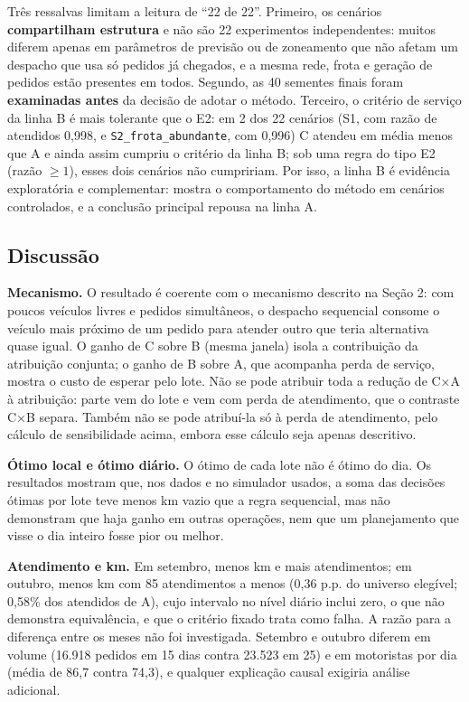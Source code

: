 
Três ressalvas limitam a leitura de \enquote{22 de 22}. Primeiro, os cenários \textbf{compartilham estrutura} e não são 22 experimentos independentes: muitos diferem apenas em parâmetros de previsão ou de zoneamento que não afetam um despacho que usa só pedidos já chegados, e a mesma rede, frota e geração de pedidos estão presentes em todos. Segundo, as 40 sementes finais foram \textbf{examinadas antes} da decisão de adotar o método. Terceiro, o critério de serviço da linha B é mais tolerante que o E2: em 2 dos 22 cenários (S1, com razão de atendidos 0,998, e \texttt{S2\_frota\_abundante}, com 0,996) C atendeu em média menos que A e ainda assim cumpriu o critério da linha B; sob uma regra do tipo E2 (razão $\ge 1$), esses dois cenários não cumpririam. Por isso, a linha B é evidência exploratória e complementar: mostra o comportamento do método em cenários controlados, e a conclusão principal repousa na linha A.

\subsection{Discussão}

\textbf{Mecanismo.} O resultado é coerente com o mecanismo descrito na Seção 2: com poucos veículos livres e pedidos simultâneos, o despacho sequencial consome o veículo mais próximo de um pedido para atender outro que teria alternativa quase igual. O ganho de C sobre B (mesma janela) isola a contribuição da atribuição conjunta; o ganho de B sobre A, que acompanha perda de serviço, mostra o custo de esperar pelo lote. Não se pode atribuir toda a redução de C×A à atribuição: parte vem do lote e vem com perda de atendimento, que o contraste C×B separa. Também não se pode atribuí-la só à perda de atendimento, pelo cálculo de sensibilidade acima, embora esse cálculo seja apenas descritivo.

\textbf{Ótimo local e ótimo diário.} O ótimo de cada lote não é ótimo do dia. Os resultados mostram que, nos dados e no simulador usados, a soma das decisões ótimas por lote teve menos km vazio que a regra sequencial, mas não demonstram que haja ganho em outras operações, nem que um planejamento que visse o dia inteiro fosse pior ou melhor.

\textbf{Atendimento e km.} Em setembro, menos km e mais atendimentos; em outubro, menos km com 85 atendimentos a menos (0,36 p.p. do universo elegível; 0,58\% dos atendidos de A), cujo intervalo no nível diário inclui zero, o que não demonstra equivalência, e que o critério fixado trata como falha. A razão para a diferença entre os meses não foi investigada. Setembro e outubro diferem em volume (16.918 pedidos em 15 dias contra 23.523 em 25) e em motoristas por dia (média de 86,7 contra 74,3), e qualquer explicação causal exigiria análise adicional.

